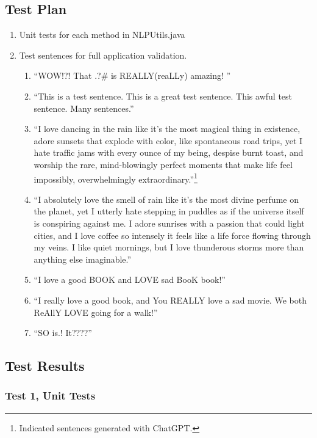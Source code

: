 \documentclass{scrartcl}
\begin{document}
\subsection{Test Plan}
\begin{enumerate}
	\item Unit tests for each method in NLPUtils.java
	\item Test sentences for full application validation.
	      \begin{enumerate}
		      \item \enquote{WOW!?!    That .?\# is REALLY(reaLLy) amazing!      }\label{sentence1}
		      \item \enquote{This is a test sentence. This is a great test sentence.  This awful test sentence.  Many sentences.}\label{sentence2}
		      \item \enquote{I love dancing in the rain like it’s the most magical thing in existence, adore sunsets that explode with color, like spontaneous road trips, yet I hate traffic jams with every ounce of my being, despise burnt toast, and worship the rare, mind-blowingly perfect moments that make life feel impossibly, overwhelmingly extraordinary.}\footnote{Indicated sentences generated with ChatGPT.\label{chatGPT}}\label{sentence3}
		      \item \enquote{I absolutely love the smell of rain like it’s the most divine perfume on the planet, yet I utterly hate stepping in puddles as if the universe itself is conspiring against me. I adore sunrises with a passion that could light cities, and I love coffee so intensely it feels like a life force flowing through my veins. I like quiet mornings, but I love thunderous storms more than anything else imaginable.}\label{sentence4}
		      \item \enquote{I love a good BOOK and LOVE sad BooK book!}\label{sentence5}
		      \item \enquote{I really love a good book, and You REALLY love a sad movie. We both ReAllY LOVE going for a walk!}\label{sentence6}
		      \item \enquote{SO is.! It????}\label{sentence7}
	      \end{enumerate}
\end{enumerate}
\newpage
\subsection{Test Results}
\subsubsection{Test 1, Unit Tests}

\clearpage
\end{document}

